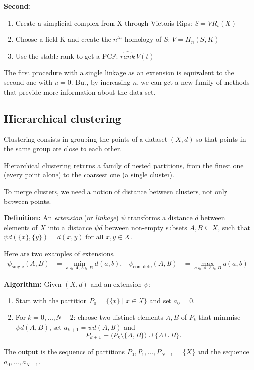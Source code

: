 \documentclass[11pt,a4paper]{article}
\begin{document}
\textbf{Second:}
\begin{enumerate}
    \item Create a simplicial complex from X through Vietoris-Rips: $S=VR_t(X)$
    \item Choose a field K and create the $n^{th}$ homology of $S$: $V=H_n(S,K)$
    \item Use the stable rank to get a PCF: $\widehat{rank}\,V(t)$
\end{enumerate}

The first procedure with a single linkage as an extension is equivalent to the second one with $n=0$. But, by increasing $n$, we can get a new family of methods that provide more information about the data set.


\subsection{Hierarchical clustering}
Clustering consists in grouping the points of a dataset $(X,d)$ so that points in the same group are close to each other.

Hierarchical clustering returns a family of nested partitions, from the finest one (every point alone) to the coarsest one (a single cluster).

To merge clusters, we need a notion of distance between clusters, not only between points.

\textbf{Definition:}
An \emph{extension} (or \emph{linkage}) $\psi$ transforms a distance $d$ between elements of $X$ into a distance $\psi d$ between non-empty subsets $A,B \subseteq X$, such that $\psi d(\{x\},\{y\}) = d(x,y)$ for all $x,y\in X$.

Here are two examples of extensions.
\begin{align*}
\psi_{\text{single}}(A,B) &= \min_{a\in A,\, b\in B} d(a,b), &
\psi_{\text{complete}}(A,B) &= \max_{a\in A,\, b\in B} d(a,b)
\end{align*}

\textbf{Algorithm:}
Given $(X,d)$ and an extension $\psi$:
\begin{enumerate}
    \item Start with the partition $P_0=\{\{x\} \mid x\in X\}$ and set $a_0=0$.
    \item For $k=0,\dots,N-2$: choose two distinct elements $A,B$ of $P_k$ that minimise $\psi d(A,B)$, set $a_{k+1}=\psi d(A,B)$ and
    \[
        P_{k+1} = \big(P_k \setminus \{A,B\}\big)\cup\{A\cup B\}.
    \]
\end{enumerate}
The output is the sequence of partitions $P_0, P_1, \dots, P_{N-1}=\{X\}$ and the sequence $a_0,\dots,a_{N-1}$.
\end{document}
